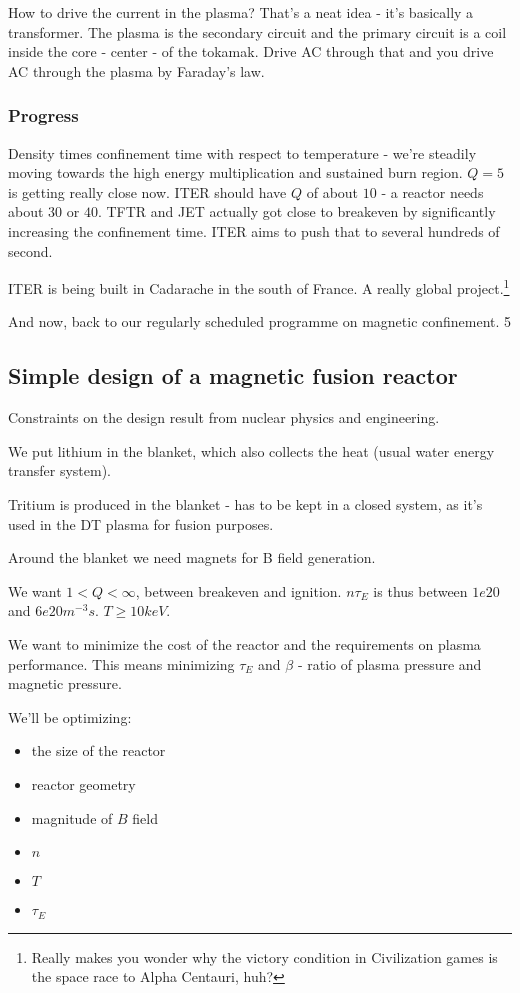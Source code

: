 \documentclass[PlasmaNotes.tex]{subfiles}
\begin{document}
How to drive the current in the plasma? That's a neat idea - it's basically a transformer. The plasma is the secondary circuit and the primary circuit is a coil inside the core - center - of the tokamak. Drive AC through that and you drive AC through the plasma by Faraday's law.

\subsubsection{Progress}
Density times confinement time with respect to temperature - we're steadily moving towards the high energy multiplication and sustained burn region. $Q = 5$ is getting really close now. ITER should have $Q$ of about $10$ - a reactor needs about $30$ or $40$. TFTR and JET actually got close to breakeven by significantly increasing the confinement time. ITER aims to push that to several hundreds of second.

ITER is being built in Cadarache in the south of France. A really global project.\footnote{Really makes you wonder why the victory condition in Civilization games is the space race to Alpha Centauri, huh?}

And now, back to our regularly scheduled programme on magnetic confinement.
5

\subsection{Simple design of a magnetic fusion reactor}

Constraints on the design result from nuclear physics and engineering.

We put lithium in the blanket, which also collects the heat (usual water energy transfer system).

Tritium is produced in the blanket - has to be kept in a closed system, as it's used in the DT plasma for fusion purposes.

Around the blanket we need magnets for B field generation.

We want $1<Q<\infty$, between breakeven and ignition. $n\tau_E$ is thus between $1e20$ and $6e20 m^{-3}s$. $T\geq 10keV$.

We want to minimize the cost of the reactor and the requirements on plasma performance. This means minimizing $\tau_E$ and $\beta$ - ratio of plasma pressure and magnetic pressure.

We'll be optimizing:
\begin{itemize}
 \item the size of the reactor
 \item reactor geometry
 \item magnitude of $B$ field
 \item $n$
 \item $T$
 \item $\tau_E$
\end{itemize}
\end{document}
